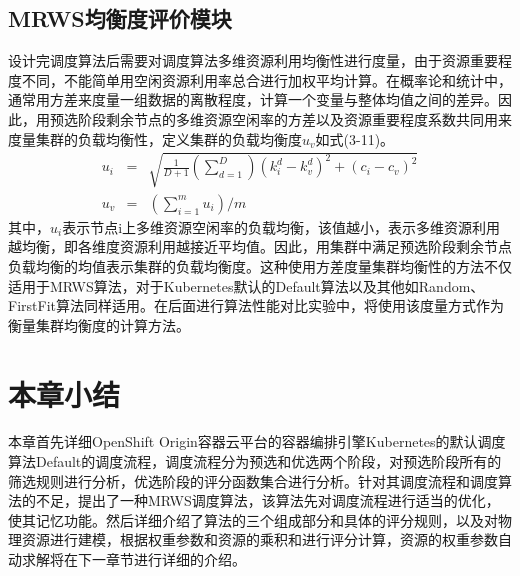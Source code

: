 \subsection{MRWS均衡度评价模块}
设计完调度算法后需要对调度算法多维资源利用均衡性进行度量，由于资源重要程度不同，不能简单用空闲资源利用率总合进行加权平均计算。在概率论和统计中，通常用方差来度量一组数据的离散程度，计算一个变量与整体均值之间的差异。因此，用预选阶段剩余节点的多维资源空闲率的方差以及资源重要程度系数共同用来度量集群的负载均衡性，定义集群的负载均衡度\begin{math}
u_{v}\end{math}如式(3-11)。
\begin{eqnarray}
	u_{i} &=& \sqrt{\frac{1}{D+1}(\sum_{d=1}^{D})(k_{i}^{d}-k_{v}^{d})^{2}+(c_{i}-c_{v})^{2}} \\[0.3cm]
	u_{v} &=& (\sum_{i=1}^{m}u_{i})/m
\end{eqnarray}
其中，\begin{math}u_{i}\end{math}表示节点i上多维资源空闲率的负载均衡，该值越小，表示多维资源利用越均衡，即各维度资源利用越接近平均值。因此，用集群中满足预选阶段剩余节点负载均衡的均值表示集群的负载均衡度。这种使用方差度量集群均衡性的方法不仅适用于MRWS算法，对于Kubernetes默认的Default算法以及其他如Random、FirstFit算法同样适用。在后面进行算法性能对比实验中，将使用该度量方式作为衡量集群均衡度的计算方法。

\section{本章小结}
本章首先详细OpenShift Origin容器云平台的容器编排引擎Kubernetes的默认调度算法Default的调度流程，调度流程分为预选和优选两个阶段，对预选阶段所有的筛选规则进行分析，优选阶段的评分函数集合进行分析。针对其调度流程和调度算法的不足，提出了一种MRWS调度算法，该算法先对调度流程进行适当的优化，使其记忆功能。然后详细介绍了算法的三个组成部分和具体的评分规则，以及对物理资源进行建模，根据权重参数和资源的乘积和进行评分计算，资源的权重参数自动求解将在下一章节进行详细的介绍。




